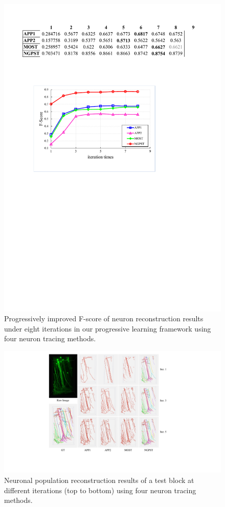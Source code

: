 \begin{figure}[t]
	\centering
	\includegraphics[width=0.8\columnwidth]{./Illustrations/trace_iterations_fscore8.pdf}
	\caption{Progressively improved F-score of neuron reconstruction results under eight iterations in our progressive learning framework using four neuron tracing methods.}%
	\label{fig:fscore_iterations}
\end{figure}


\begin{figure}[t]
	\centering
	\includegraphics[width=1\columnwidth]{./Illustrations/trace_iterations3.pdf}
	\caption{Neuronal population reconstruction results of a test block at different iterations (top to bottom) using four neuron tracing methods.} 
	\label{fig:trace_iterations}
\end{figure}

